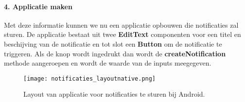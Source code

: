 \paragraph{4. Applicatie maken}
Met deze informatie kunnen we nu een applicatie opbouwen die notificaties zal sturen. De applicatie bestaat 
uit twee \textbf{EditText} componenten voor een titel en beschijving van de notificatie en tot slot een 
\textbf{Button} om de notificatie te triggeren. Als de knop wordt ingedrukt dan wordt de 
\textbf{createNotification} methode aangeroepen en wordt de waarde van de inputs meegegeven.
\begin{figure}[H]
  \centering
  \texttt{[image: notificaties\_layoutnative.png]}
  \caption{Layout van applicatie voor notificaties te sturen bij Android.}
\end{figure}